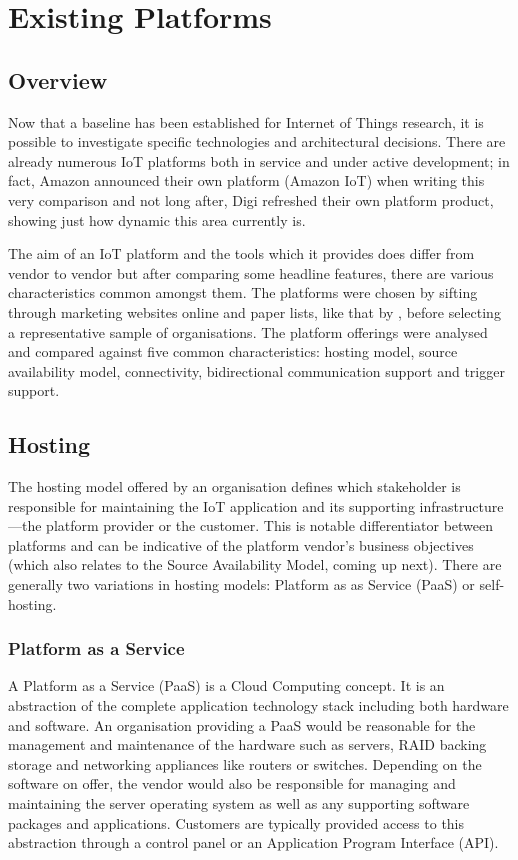   \section{Existing Platforms}\label{existing-platforms}
    \subsection{Overview}
      Now that a baseline has been established for Internet of Things research, it is possible to investigate specific technologies and architectural decisions. There are already numerous IoT platforms both in service and under active development; in fact, Amazon announced their own platform (Amazon IoT) when writing this very comparison and not long after, Digi refreshed their own platform product, showing just how dynamic this area currently is.

      The aim of an IoT platform and the tools which it provides does differ from vendor to vendor but after comparing some headline features, there are various characteristics common amongst them. The platforms were chosen by sifting through marketing websites online and paper lists, like that by \citet{contemporaryIOT:2015}, before selecting a representative sample of organisations. The platform offerings were analysed and compared against five common characteristics: hosting model, source availability model, connectivity, bidirectional communication support and trigger support.

    \subsection{Hosting}
      The hosting model offered by an organisation defines which stakeholder is responsible for maintaining the IoT application and its supporting infrastructure---the platform provider or the customer. This is notable differentiator between platforms and can be indicative of the platform vendor's business objectives (which also relates to the Source Availability Model, coming up next). There are generally two variations in hosting models: Platform as as Service (PaaS) or self-hosting.

      \subsubsection{Platform as a Service}
        A Platform as a Service (PaaS) is a Cloud Computing concept. It is an abstraction of the complete application technology stack including both hardware and software. An organisation providing a PaaS would be reasonable for the management and maintenance of the hardware such as servers, RAID backing storage and networking appliances like routers or switches. Depending on the software on offer, the vendor would also be responsible for managing and maintaining the server operating system as well as any supporting software packages and applications. Customers are typically provided access to this abstraction through a control panel or an Application Program Interface (API).

